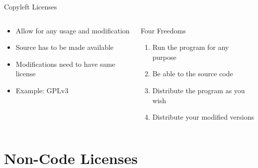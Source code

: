 \documentclass[compress,aspectratio=169]{beamer}
\begin{document}
  \begin{frame}{Copyleft Licenses}
    \begin{columns}
      \begin{column}{0.5\textwidth}
        \begin{itemize}
          \item Allow for any usage and modification
          \item Source has to be made available
          \item Modifications need to have same license
          \item Example: GPLv3
        \end{itemize}
      \end{column}
      \begin{column}{0.5\textwidth}
        \begin{block}{Four Freedoms \cite{freedoms}}
          \begin{enumerate}
            \item Run the program for any purpose
            \item Be able to the source code
            \item Distribute the program as you wish
            \item Distribute your modified versions
          \end{enumerate}
        \end{block}
      \end{column}
    \end{columns}
  \end{frame}

\section{Non-Code Licenses}
\end{document}
